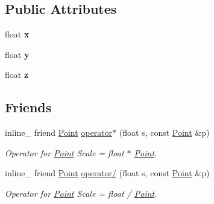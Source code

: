 \subsection*{Public Attributes}
\begin{DoxyCompactItemize}
\item 
float {\bfseries x}\hypertarget{classOpcode_1_1Point_a3e402e6a2b15290948ac7311b8bf6baa}{}\label{classOpcode_1_1Point_a3e402e6a2b15290948ac7311b8bf6baa}

\item 
float {\bfseries y}\hypertarget{classOpcode_1_1Point_a72e99462a762bb5ec71fded4d8fce557}{}\label{classOpcode_1_1Point_a72e99462a762bb5ec71fded4d8fce557}

\item 
float {\bfseries z}\hypertarget{classOpcode_1_1Point_a3b49a6420928384579cda1225041532a}{}\label{classOpcode_1_1Point_a3b49a6420928384579cda1225041532a}

\end{DoxyCompactItemize}
\subsection*{Friends}
\begin{DoxyCompactItemize}
\item 
inline\+\_\+ friend \hyperlink{classOpcode_1_1Point}{Point} \hyperlink{classOpcode_1_1Point_a9ff6f894ad3fd6ffe459481cef490d8f}{operator$\ast$} (float s, const \hyperlink{classOpcode_1_1Point}{Point} \&p)\hypertarget{classOpcode_1_1Point_a9ff6f894ad3fd6ffe459481cef490d8f}{}\label{classOpcode_1_1Point_a9ff6f894ad3fd6ffe459481cef490d8f}

\begin{DoxyCompactList}\small\item\em Operator for \hyperlink{classOpcode_1_1Point}{Point} Scale = float $\ast$ \hyperlink{classOpcode_1_1Point}{Point}. \end{DoxyCompactList}\item 
inline\+\_\+ friend \hyperlink{classOpcode_1_1Point}{Point} \hyperlink{classOpcode_1_1Point_a701c7cd1827352be21328ffe9021fec3}{operator/} (float s, const \hyperlink{classOpcode_1_1Point}{Point} \&p)\hypertarget{classOpcode_1_1Point_a701c7cd1827352be21328ffe9021fec3}{}\label{classOpcode_1_1Point_a701c7cd1827352be21328ffe9021fec3}

\begin{DoxyCompactList}\small\item\em Operator for \hyperlink{classOpcode_1_1Point}{Point} Scale = float / \hyperlink{classOpcode_1_1Point}{Point}. \end{DoxyCompactList}\end{DoxyCompactItemize}


